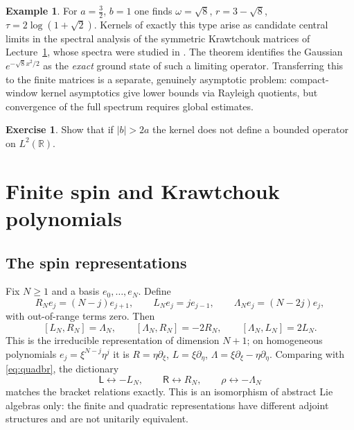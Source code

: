 \documentclass[11pt,reqno]{amsart}
\theoremstyle{definition}
\newtheorem{example}[theorem]{Example}
\newtheorem{exercise}[theorem]{Exercise}
\theoremstyle{remark}
\newcommand{\R}{\mathbb R}
\begin{document}
\begin{example}\label{ex:sqrt8}
For $a=\frac32$, $b=1$ one finds $\omega=\sqrt8$, $r=3-\sqrt8$,
$\tau=2\log(1+\sqrt2)$. Kernels of exactly this type arise as candidate
central limits in the spectral analysis of the symmetric Krawtchouk
matrices of Lecture~\ref{L:spin}, whose spectra were studied in
\cite{FeinsilverFitzgerald1996}. The theorem identifies the Gaussian
$e^{-\sqrt8x^2/2}$ as the \emph{exact} ground state of such a limiting
operator. Transferring this to the finite matrices is a separate,
genuinely asymptotic problem: compact-window kernel asymptotics give
lower bounds via Rayleigh quotients, but convergence of the full spectrum
requires global estimates.
\end{example}

\begin{exercise}
Show that if $|b|>2a$ the kernel does not define a bounded operator on
$L^2(\R)$.
\end{exercise}

\section{Finite spin and Krawtchouk polynomials}\label{L:spin}

\subsection{The spin representations}
Fix $N\ge1$ and a basis $e_0,\dots,e_N$. Define
\[
R_Ne_j=(N-j)e_{j+1},\qquad L_Ne_j=je_{j-1},\qquad
\Lambda_Ne_j=(N-2j)e_j,
\]
with out-of-range terms zero. Then
\begin{equation}\label{eq:finbr}
[L_N,R_N]=\Lambda_N,\qquad [\Lambda_N,R_N]=-2R_N,\qquad
[\Lambda_N,L_N]=2L_N.
\end{equation}
This is the irreducible representation of dimension $N+1$; on
homogeneous polynomials $e_j=\xi^{N-j}\eta^j$ it is
$R=\eta\partial_\xi$, $L=\xi\partial_\eta$,
$\Lambda=\xi\partial_\xi-\eta\partial_\eta$. Comparing with
\eqref{eq:quadbr}, the dictionary
\begin{equation}\label{eq:dict}
\mathsf L\leftrightarrow-L_N,\qquad\mathsf R\leftrightarrow R_N,\qquad
\rho\leftrightarrow-\Lambda_N
\end{equation}
matches the bracket relations exactly. This is an isomorphism of
abstract Lie algebras only: the finite and quadratic representations
have different adjoint structures and are not unitarily equivalent.
\end{document}
